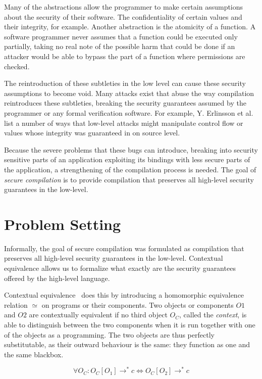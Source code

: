 \documentclass[11pt]{article}
\begin{document}
Many of the abstractions allow the programmer to make certain assumptions about the security of their software.
The confidentiality of certain values and their integrity, for example.
Another abstraction is the atomicity of a function.
A software programmer never assumes that a function could be executed only partially, taking no real note of the possible harm that could be done if an attacker would be able to bypass the part of a function where permissions are checked.

The reintroduction of these subtleties in the low level can cause these security assumptions to become void.
Many attacks exist that abuse the way compilation reintroduces these subtleties, breaking the security guarantees assumed by the programmer or any formal verification software.
For example, Y. Erlinsson et al.~\cite{OVSPaper} list a number of ways that low-level attacks might manipulate control flow or values whose integrity was guaranteed in on source level.

Because the severe problems that these bugs can introduce, breaking into security sensitive parts of an application exploiting its bindings with less secure parts of the application, a strengthening of the compilation process is needed.
The goal of \emph{secure compilation} is to provide compilation that preserves all high-level security guarantees in the low-level.

\section{Problem Setting}
Informally, the goal of secure compilation was formulated as compilation that preserves all high-level security guarantees in the low-level.
Contextual equivalence allows us to formalize what exactly are the security guarantees offered by the high-level language.

Contextual equivalence~\cite{Agten:2012:SCM:2354412.2355247} does this by introducing a homomorphic equivalence relation $\simeq$ on programs or their components.
Two objects or components $O1$ and $O2$ are contextually equivalent if no third object $O_C$, called the \emph{context}, is able to distinguish between the two components when it is run together with one of the objects as a programming.
The two objects are thus perfectly substitutable, as their outward behaviour is the same: they function as one and the same blackbox.

\[
 \forall O_C : O_C[O_1] \rightarrow^* c \iff O_C[O_2] \rightarrow^* c
\]
\end{document}
